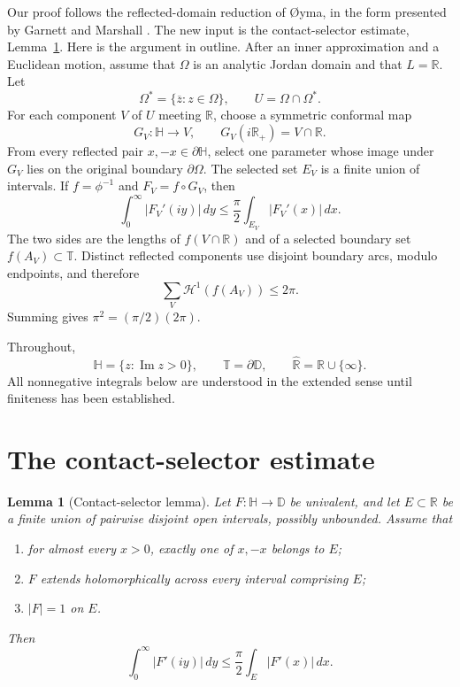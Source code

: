 \documentclass[11pt]{article}
\newtheorem{lemma}[theorem]{Lemma}
\theoremstyle{remark}
\newcommand{\D}{\mathbb D}
\newcommand{\Hh}{\mathbb H}
\newcommand{\T}{\mathbb T}
\newcommand{\R}{\mathbb R}
\newcommand{\Rhat}{\widehat{\mathbb R}}
\newcommand{\Haus}{\mathcal H^1}
\begin{document}
Our proof follows the reflected-domain reduction of {\O}yma, in the form
presented by Garnett and Marshall \cite[Chapter~I, Section~5]{GarnettMarshall}.
The new input is the contact-selector estimate, Lemma~\ref{lem:selector}.
Here is the argument in outline. After an inner approximation and a Euclidean
motion, assume that $\Omega$ is an analytic Jordan domain and that $L=\R$.
Let
\[
  \Omega^*=\{\overline z:z\in\Omega\},
  \qquad U=\Omega\cap\Omega^*.
\]
For each component $V$ of $U$ meeting $\R$, choose a symmetric conformal map
\[
  G_V:\Hh\to V,
  \qquad G_V(i\R_+)=V\cap\R.
\]
From every reflected pair $x,-x\in\partial\Hh$, select one parameter whose
image under $G_V$ lies on the original boundary $\partial\Omega$. The selected
set $E_V$ is a finite union of intervals. If $f=\phi^{-1}$ and
$F_V=f\circ G_V$, then
\[
  \int_0^\infty |F_V'(iy)|\,dy
  \le \frac\pi2\int_{E_V}|F_V'(x)|\,dx.
\]
The two sides are the lengths of $f(V\cap\R)$ and of a selected boundary set
$f(A_V)\subset\T$. Distinct reflected components use disjoint boundary arcs,
modulo endpoints, and therefore
\[
  \sum_V\Haus(f(A_V))\le2\pi.
\]
Summing gives $\pi^2=(\pi/2)(2\pi)$.

Throughout,
\[
  \Hh=\{z:\operatorname{Im}z>0\},
  \qquad \T=\partial\D,
  \qquad \Rhat=\R\cup\{\infty\}.
\]
All nonnegative integrals below are understood in the extended sense until
finiteness has been established.

\section{The contact-selector estimate}

\begin{lemma}[Contact-selector lemma]\label{lem:selector}
Let $F:\Hh\to\D$ be univalent, and let $E\subset\R$ be a finite union of
pairwise disjoint open intervals, possibly unbounded. Assume that
\begin{enumerate}[label=\textup{(\roman*)},leftmargin=2.4em]
\item for almost every $x>0$, exactly one of $x,-x$ belongs to $E$;
\item $F$ extends holomorphically across every interval comprising $E$;
\item $|F|=1$ on $E$.
\end{enumerate}
Then
\begin{equation}\label{eq:selector-main}
  \int_0^\infty |F'(iy)|\,dy
  \le \frac\pi2\int_E|F'(x)|\,dx.
\end{equation}
\end{lemma}
\end{document}
